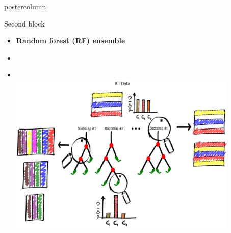 \documentclass[final]{beamer}
\begin{document}
\begin{frame}
\begin{columns}
\begin{column}{.33\textwidth}
\begin{beamercolorbox}[center,wd=\textwidth]{postercolumn}
\begin{minipage}[T]{.95\textwidth}
{            \begin{block}{Second block}
            \begin{itemize}
            	\item \textbf{\color{orounam}Random forest (RF) ensemble}
            	\item []
            	\item []
            	\begin{columns}
            		\begin{column}{.54\textwidth}
            		\\
            			\includegraphics[width = 0.9\textwidth, height = 0.15\textheight]{images/framework/RF_train.png}
            		\end{column}
            		\begin{column}{.44\textwidth}
            		\\

\end{column}
\end{columns}
\end{itemize}
\end{block}}
\end{minipage}
\end{beamercolorbox}
\end{column}
\end{columns}
\end{frame}
\end{document}
